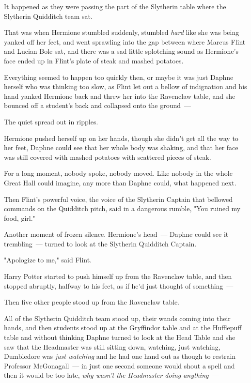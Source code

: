 It happened as they were passing the part of the Slytherin table where the
Slytherin Quidditch team sat.

That was when Hermione stumbled suddenly, stumbled \emph{hard} like she was
being yanked off her feet, and went sprawling into the gap between where Marcus
Flint and Lucian Bole sat, and there was a sad little splotching sound as
Hermione's face ended up in Flint's plate of steak and mashed potatoes.

Everything seemed to happen too quickly then, or maybe it was just Daphne
herself who was thinking too slow, as Flint let out a bellow of indignation and
his hand yanked Hermione back and threw her into the Ravenclaw table, and she
bounced off a student's back and collapsed onto the ground~---

The quiet spread out in ripples.

Hermione pushed herself up on her hands, though she didn't get all the way to
her feet, Daphne could see that her whole body was shaking, and that her face
was still covered with mashed potatoes with scattered pieces of steak.

For a long moment, nobody spoke, nobody moved. Like nobody in the whole Great
Hall could imagine, any more than Daphne could, what happened next.

Then Flint's powerful voice, the voice of the Slytherin Captain that bellowed
commands on the Quidditch pitch, said in a dangerous rumble, "You ruined my
food, girl."

Another moment of frozen silence. Hermione's head~--- Daphne could see it
trembling~--- turned to look at the Slytherin Quidditch Captain.

"Apologize to me," said Flint.

Harry Potter started to push himself up from the Ravenclaw table, and then
stopped abruptly, halfway to his feet, as if he'd just thought of something~---

Then five other people stood up from the Ravenclaw table.

All of the Slytherin Quidditch team stood up, their wands coming into their
hands, and then students stood up at the Gryffindor table and at the Hufflepuff
table and without thinking Daphne turned to look at the Head Table and she saw
that the Headmaster was still sitting down, watching, just watching, Dumbledore
was \emph{just watching} and he had one hand out as though to restrain
Professor McGonagall~--- in just one second someone would shout a spell and then
it would be too late, \emph{why wasn't the Headmaster doing anything}~---

